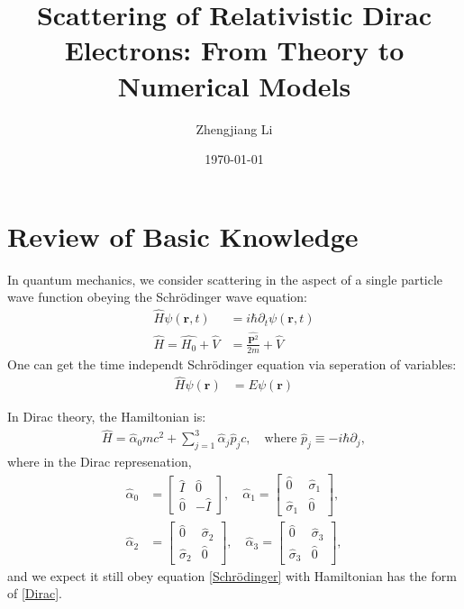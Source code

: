 \documentclass{article}
\title{Scattering of Relativistic Dirac Electrons: From Theory to Numerical Models}
\author{Zhengjiang Li}
\date{\today}
\numberwithin{equation}{section}
\begin{document}
	
	\maketitle
	\tableofcontents



\section{Review of Basic Knowledge}

In quantum mechanics, we consider scattering in the aspect of a single particle wave function obeying the Schrödinger wave equation:
\begin{align}
	\hat{H}\psi(\boldsymbol{r},t)&=i\hbar\partial_t\psi(\boldsymbol{r},t)\label{Schrödinger}\\
    \hat{H}=\hat{H_0}+\hat{V}&=\frac{\hat{\boldsymbol{P}^2}}{2m}+\hat{V}
\end{align}
One can get the time independt Schrödinger equation via seperation of variables:
\begin{align}
	\hat{H}\psi(\boldsymbol{r})&=E\psi(\boldsymbol{r})
\end{align}

In Dirac theory, the Hamiltonian is:
\begin{align}
    \hat{H} = \hat{\alpha}_0 m c^2 + \sum_{j=1}^{3} \hat{\alpha}_j \hat{p}_j c, \quad \text{where } \hat{p}_j \equiv -i \hbar \partial_j, \label{Dirac}
\end{align}
where in the Dirac represenation,
\begin{align}
    \hat{\alpha}_0 &= 
    \begin{bmatrix}
    \hat{I} & \hat{0} \\
    \hat{0} & -\hat{I}
    \end{bmatrix}, \quad
    \hat{\alpha}_1 = 
    \begin{bmatrix}
    \hat{0} & \hat{\sigma}_1 \\
    \hat{\sigma}_1 & \hat{0}
    \end{bmatrix}, \\
    \hat{\alpha}_2 &= 
    \begin{bmatrix}
    \hat{0} & \hat{\sigma}_2 \\
    \hat{\sigma}_2 & \hat{0}
    \end{bmatrix}, \quad
    \hat{\alpha}_3 = 
    \begin{bmatrix}
    \hat{0} & \hat{\sigma}_3 \\
    \hat{\sigma}_3 & \hat{0}
    \end{bmatrix},
\end{align}
and we expect it still obey equation \eqref{Schrödinger} with Hamiltonian has the form of \eqref{Dirac}. 
\end{document}
